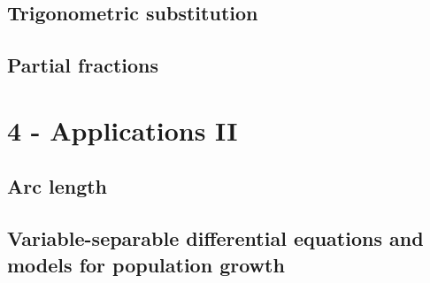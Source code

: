 \documentclass[
]{article}
\begin{document}
\hypertarget{trigonometric-substitution}{%
\subsection{Trigonometric
substitution}\label{trigonometric-substitution}}

\hypertarget{partial-fractions}{%
\subsection{Partial fractions}\label{partial-fractions}}

\hypertarget{applications-ii}{%
\section{4 - Applications II}\label{applications-ii}}

\hypertarget{arc-length}{%
\subsection{Arc length}\label{arc-length}}

\hypertarget{variable-separable-differential-equations-and-models-for-population-growth}{%
\subsection{Variable-separable differential equations and models for
population
growth}\label{variable-separable-differential-equations-and-models-for-population-growth}}
\end{document}
